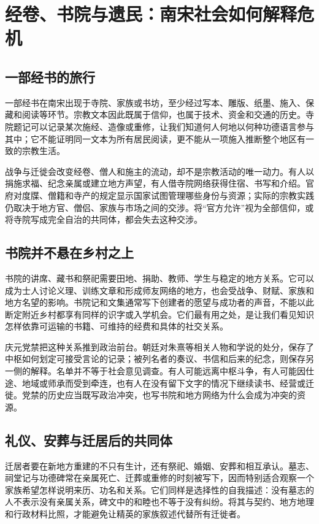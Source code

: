 \section{经卷、书院与遗民：南宋社会如何解释危机}

\subsection{一部经书的旅行}

一部经书在南宋出现于寺院、家族或书坊，至少经过写本、雕版、纸墨、施入、保藏和阅读等环节。宗教文本因此既属于信仰，也属于技术、资金和交通的历史。寺院题记可以记录某次施经、造像或重修，让我们知道何人何地以何种功德语言参与其中；它不能证明同一文本为所有居民阅读，更不能从一项施入推断整个地区有一致的宗教生活。

战争与迁徙会改变经卷、僧人和施主的流动，却不是宗教活动的唯一动力。有人以捐施求福、纪念亲属或建立地方声望，有人借寺院网络获得住宿、书写和介绍。官府对度牒、僧籍和寺产的规定显示国家试图管理哪些身份与资源；实际的宗教实践仍取决于地方官、僧侣、家族与市场之间的交涉。将“官方允许”视为全部信仰，或将寺院写成完全自治的共同体，都会失去这种交涉。

\subsection{书院并不悬在乡村之上}

书院的讲席、藏书和祭祀需要田地、捐助、教师、学生与稳定的地方关系。它可以成为士人讨论义理、训练文章和形成师友网络的地方，也会受战争、财赋、家族和地方名望的影响。书院记和文集通常写下创建者的愿望与成功者的声音，不能以此断定附近乡村都享有同样的识字或入学机会。它们最有用之处，是让我们看见知识怎样依靠可运输的书籍、可维持的经费和具体的社交关系。

庆元党禁把这种关系推到政治前台。朝廷对朱熹等相关人物和学说的处分，保存了中枢如何划定可接受言论的记录；被列名者的奏议、书信和后来的纪念，则保存另一侧的解释。名单并不等于社会意见调查。有人可能远离中枢斗争，有人可能因仕途、地域或师承而受到牵连，也有人在没有留下文字的情况下继续读书、经营或迁徙。党禁的历史应当既写政治冲突，也写书院和地方网络为什么会成为冲突的资源。

\subsection{礼仪、安葬与迁居后的共同体}

迁居者要在新地方重建的不只有生计，还有祭祀、婚姻、安葬和相互承认。墓志、祠堂记与功德碑常在亲属死亡、迁葬或重修的时刻被写下，因而特别适合观察一个家族希望怎样说明来历、功名和关系。它们同样是选择性的自我描述：没有墓志的人不表示没有亲属关系，碑文中的和睦也不等于没有纠纷。将其与契约、地方地理和行政材料比照，才能避免让精英的家族叙述代替所有迁徙者。

